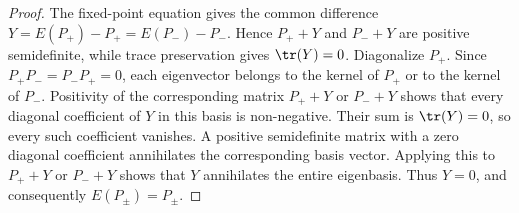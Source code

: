 \begin{proof}
    \leanok
    The fixed-point equation gives the common difference
    $Y=E(P_+)-P_+=E(P_-)-P_-$. Hence $P_++Y$ and $P_-+Y$ are positive
    semidefinite, while trace preservation gives $\tr(Y)=0$. Diagonalize
    $P_+$. Since $P_+P_-=P_-P_+=0$, each eigenvector belongs to the kernel
    of $P_+$ or to the kernel of $P_-$. Positivity of the corresponding
    matrix $P_++Y$ or $P_-+Y$ shows that every diagonal coefficient of $Y$
    in this basis is non-negative. Their sum is $\tr(Y)=0$, so every such
    coefficient vanishes. A positive semidefinite matrix with a zero diagonal
    coefficient annihilates the corresponding basis vector. Applying this to
    $P_++Y$ or $P_-+Y$ shows that $Y$ annihilates the entire eigenbasis.
    Thus $Y=0$, and consequently $E(P_\pm)=P_\pm$.
\end{proof}
